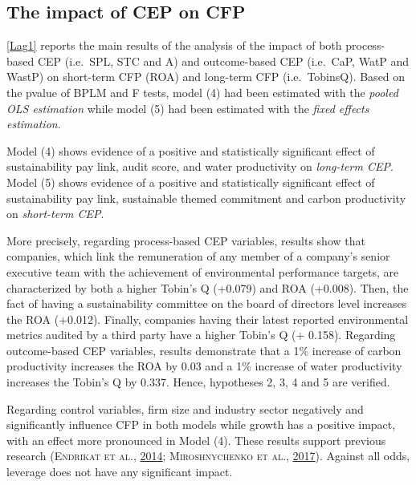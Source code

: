 \documentclass[12pt,]{article}
\begin{document}
\subsection{The impact of CEP on CFP}\label{the-impact-of-cep-on-cfp}

\autoref{Lag1} reports the main results of the analysis of the impact of
both process-based CEP (i.e.~SPL, STC and A) and outcome-based CEP
(i.e.~CaP, WatP and WastP) on short-term CFP (ROA) and long-term CFP
(i.e.~TobinsQ). Based on the pvalue of BPLM and F tests, model (4) had
been estimated with the \emph{pooled OLS estimation} while model (5) had
been estimated with the \emph{fixed effects estimation}.

Model (4) shows evidence of a positive and statistically significant
effect of sustainability pay link, audit score, and water productivity
on \emph{long-term CEP}. Model (5) shows evidence of a positive and
statistically significant effect of sustainability pay link, sustainable
themed commitment and carbon productivity on \emph{short-term CEP}.

More precisely, regarding process-based CEP variables, results show that
companies, which link the remuneration of any member of a company's
senior executive team with the achievement of environmental performance
targets, are characterized by both a higher Tobin's Q (+0.079) and ROA
(+0.008). Then, the fact of having a sustainability committee on the
board of directors level increases the ROA (+0.012). Finally, companies
having their latest reported environmental metrics audited by a third
party have a higher Tobin's Q (+ 0.158). Regarding outcome-based CEP
variables, results demonstrate that a 1\% increase of carbon
productivity increases the ROA by 0.03 and a 1\% increase of water
productivity increases the Tobin's Q by 0.337. Hence, hypotheses 2, 3, 4
and 5 are verified.

Regarding control variables, firm size and industry sector negatively
and significantly influence CFP in both models while growth has a
positive impact, with an effect more pronounced in Model (4). These
results support previous research (\textsc{Endrikat et al.},
\protect\hyperlink{ref-EndrikatMakingsenseconflicting2014}{2014};
\textsc{Miroshnychenko et al.},
\protect\hyperlink{ref-MiroshnychenkoGreenpracticesfinancial2017}{2017}).
Against all odds, leverage does not have any significant impact.
\end{document}
